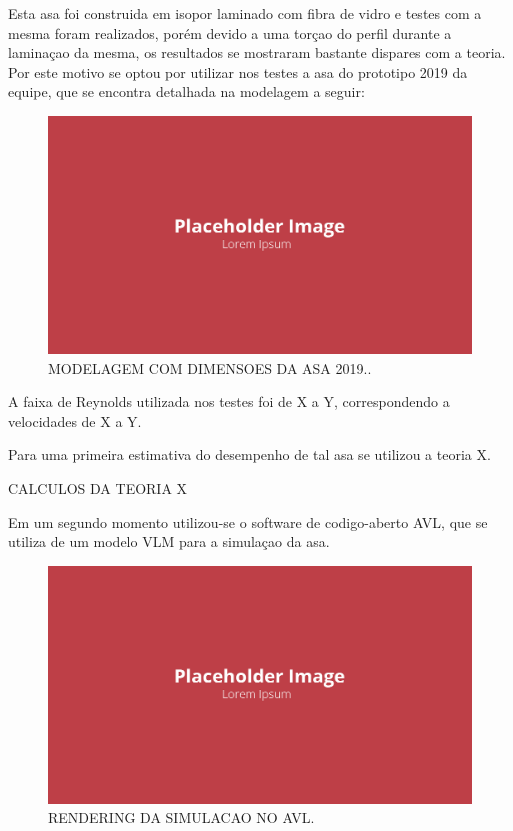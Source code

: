 Esta asa foi construida em isopor laminado com fibra de vidro e testes com a mesma foram realizados, porém devido a uma torçao do perfil durante a laminaçao da mesma, os resultados se mostraram bastante dispares com a teoria. Por este motivo se optou por utilizar nos testes a asa do prototipo 2019 da equipe, que se encontra detalhada na modelagem a seguir:

\begin{figure}[!ht]
    \centering
    \includegraphics[width=.8\linewidth]{figuras/placeholder.png}
    \caption{MODELAGEM COM DIMENSOES DA ASA 2019.\cite{autor}.}
    \label{fig:placeholder}
\end{figure}

A faixa de Reynolds utilizada nos testes foi de X a Y, correspondendo a velocidades de X a Y.

Para uma primeira estimativa do desempenho de tal asa se utilizou a teoria X.

CALCULOS DA TEORIA X

Em um segundo momento utilizou-se o software de codigo-aberto AVL, que se utiliza de um modelo VLM para a simulaçao da asa.

\begin{figure}[!ht]
    \centering
    \includegraphics[width=.8\linewidth]{figuras/placeholder.png}
    \caption{RENDERING DA SIMULACAO NO AVL\cite{autor}.}
    \label{fig:placeholder}
\end{figure}

